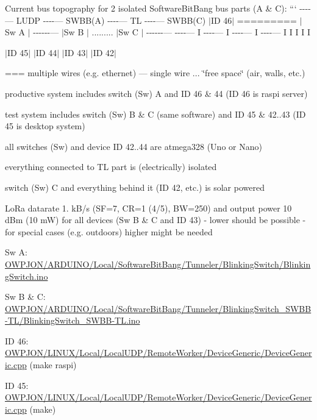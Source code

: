 Current bus topography for 2 isolated Software\-Bit\-Bang bus parts (A \& C)\-: ``` -\/-\/-\/-\/--- L\-U\-D\-P -\/-\/-\/-\/--- S\-W\-B\-B(\-A) -\/-\/-\/-\/--- T\-L -\/-\/-\/-\/--- S\-W\-B\-B(\-C) $\vert$\-I\-D 46$\vert$ ========= $\vert$\-Sw A $\vert$ -\/-\/-\/-\/-\/-\/--- $\vert$\-Sw B $\vert$ ......... $\vert$\-Sw C $\vert$ -\/-\/-\/-\/-\/-\/--- -\/-\/-\/-\/--- I -\/-\/-\/-\/--- I -\/-\/-\/-\/--- I -\/-\/-\/-\/--- I I I I I 

 $\vert$\-I\-D 45$\vert$ $\vert$\-I\-D 44$\vert$ $\vert$\-I\-D 43$\vert$ $\vert$\-I\-D 42$\vert$ 



=== multiple wires (e.\-g. ethernet) --- single wire ... \char`\"{}free space\char`\"{} (air, walls, etc.)


\begin{DoxyItemize}
\item productive system includes switch (Sw) A and I\-D 46 \& 44 (I\-D 46 is raspi server)
\item test system includes switch (Sw) B \& C (same software) and I\-D 45 \& 42..43 (I\-D 45 is desktop system)
\item all switches (Sw) and device I\-D 42..44 are atmega328 (Uno or Nano)
\item everything connected to T\-L part is (electrically) isolated
\item switch (Sw) C and everything behind it (I\-D 42, etc.) is solar powered
\item Lo\-Ra datarate 1. k\-B/s (S\-F=7, C\-R=1 (4/5), B\-W=250) and output power 10 d\-Bm (10 m\-W) for all devices (Sw B \& C and I\-D 43) -\/ lower should be possible -\/ for special cases (e.\-g. outdoors) higher might be needed
\item Sw A\-: \hyperlink{BlinkingSwitch_8ino}{O\-W\-P\-J\-O\-N/\-A\-R\-D\-U\-I\-N\-O/\-Local/\-Software\-Bit\-Bang/\-Tunneler/\-Blinking\-Switch/\-Blinking\-Switch.\-ino}
\item Sw B \& C\-: \hyperlink{BlinkingSwitch__SWBB-TL_8ino}{O\-W\-P\-J\-O\-N/\-A\-R\-D\-U\-I\-N\-O/\-Local/\-Software\-Bit\-Bang/\-Tunneler/\-Blinking\-Switch\-\_\-\-S\-W\-B\-B-\/\-T\-L/\-Blinking\-Switch\-\_\-\-S\-W\-B\-B-\/\-T\-L.\-ino}
\item I\-D 46\-: \hyperlink{LocalUDP_2RemoteWorker_2DeviceGeneric_2DeviceGeneric_8cpp}{O\-W\-P\-J\-O\-N/\-L\-I\-N\-U\-X/\-Local/\-Local\-U\-D\-P/\-Remote\-Worker/\-Device\-Generic/\-Device\-Generic.\-cpp} (make raspi)
\item I\-D 45\-: \hyperlink{LocalUDP_2RemoteWorker_2DeviceGeneric_2DeviceGeneric_8cpp}{O\-W\-P\-J\-O\-N/\-L\-I\-N\-U\-X/\-Local/\-Local\-U\-D\-P/\-Remote\-Worker/\-Device\-Generic/\-Device\-Generic.\-cpp} (make)

\end{DoxyItemize}
